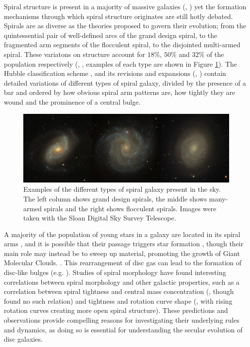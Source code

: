 
Spiral structure is present in a majority of massive galaxies (\citealt{1989gadv.book..151B}, \citealt{2008MNRAS.389.1179L}) yet the formation mechanisms through which spiral structure originates are still hotly debated. Spirals are as diverse as the theories proposed to govern their evolution; from the quintessential pair of well-defined arcs of the grand design spiral, to the fragmented arm segments of the flocculent spiral, to the disjointed multi-armed spiral. These variatons on structure account for $18\%$, $50\%$ and $32\%$ of the population respectively (\citealt{2011ApJ...737...32E}, \citealt{2015yCat..22170032B}, examples of each type are shown in Figure \ref{fig:spiral-galaxy-types}). The Hubble classification scheme \citep{1926ApJ....64..321H}, and its revisions and expansions (\citealt{1961hag..book.....S}, \citealt{1991rc3..book.....D}) contain detailed variations of different types of spiral galaxy, divided by the presence of a bar and ordered by how obvious spiral arm patterns are, how tightly they are wound and the prominence of a central bulge.

\begin{figure}
  \includegraphics[width=13cm]{plots/galaxy_types.jpg}
  \caption{Examples of the different types of spiral galaxy present in the sky. The left column shows grand design spirals, the middle shows many-armed spirals and the right shows flocculent spirals. Images were taken with the Sloan Digital Sky Survey Telescope.}
  \label{fig:spiral-galaxy-types}
\end{figure}

A majority of the population of young stars in a galaxy are located in its spiral arms \citep{2011EAS....51...19E}, and it is possible that their passage triggers star formation \citep{2013A&A...560A..59C}, though their main role may instead be to sweep up material, promoting the growth of Giant Molecular Clouds. \citep{2014IAUS..298..221D}. This rearrangement of disc gas can lead to the formation of disc-like bulges (e.g. \citealt{2004ARA&A..42..603K}). Studies of spiral morphology have found interesting correlations between spiral morphology and other galactic properties, such as a correlation between spiral tightness and central mass concentration (\citealt{2019ApJ...871..194Y}, though \citealt{2017MNRAS.472.2263H} found no such relation) and tightness and rotation curve shape (\citealt{2005MNRAS.359.1065S}, with rising rotation curves creating more open spiral structure). These predictions and observations provide compelling reasons for investigating their underlying rules and dynamics, as doing so is essential for understanding the secular evolution of disc galaxies.

